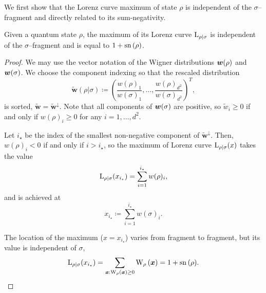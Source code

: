 \documentclass[pra,
aps,
twocolumn,
superscriptaddress,
groupedaddress,
nofootinbib,
reprint
]{revtex4-1}
\begin{document}
We first show that the Lorenz curve maximum of state $\rho$ is independent of the $\sigma$--fragment and directly related to its sum-negativity.
\begin{lemma}\label{lem:lcmax}
	Given a quantum state $\rho$, the maximum of its Lorenz curve ${{\rm{L}}_{\rho|\sigma}}$ is independent of the $\sigma$--fragment and is equal to $1+{{\rm{sn}}\left(\rho\right)}$.
\end{lemma}
\begin{proof}
	We may use the vector notation of the Wigner distributions $\bm{w}(\rho)$ and $\bm{w}(\sigma)$.
	We choose the component indexing so that the rescaled distribution 
	\begin{equation}
		\widetilde{\bm{w}}(\rho|\sigma) \coloneqq \left(\frac{w(\rho)_1}{w(\sigma)_1}, \dots, \frac{w(\rho)_{d^2}}{w(\sigma)_{d^2}} \right)^T,
	\end{equation}
	is sorted, $\widetilde{\bm{w}} = \widetilde{\bm{w}}^\downarrow$.
	Note that all components of $\bm{w}(\sigma)$ are positive, so $\widetilde{w}_i \geq 0$ if and only if $w(\rho)_i \geq 0$ for any $i=1,\dots,d^2$.
	
	Let $i_\star$ be the index of the smallest non-negative component of $\widetilde{\bm{w}}^\downarrow$.
	Then, $w(\rho)_i < 0$ if and only if $i > i_\star$, so the maximum of Lorenz curve ${{\rm{L}}_{\rho|\sigma}}(x)$ takes the value 
	\begin{equation}
		{{\rm{L}}_{\rho|\sigma}}(x_{i_\star}) = \sum_{i=1}^{i_\star} w(\rho)_i,
	\end{equation}
	and is achieved at
	\begin{equation}\label{eq:maxloc}
		x_{i_\star} \coloneqq \sum_{i=1}^{i_\star} w(\sigma)_i.
	\end{equation}

	The location of the maximum ($x=x_{i_\star}$) varies from fragment to fragment, but its value is independent of $\sigma$,
	\begin{equation}
		\lc{\rho}{\sigma}(x_{i_\star})
		= \sum\limits_{\bmx: \W[\bmx]{\rho} \geq 0} \W[\bmx]{\rho}
		= 1 + \sn{\rho}.
	\end{equation}
	
\end{proof}
\end{document}
